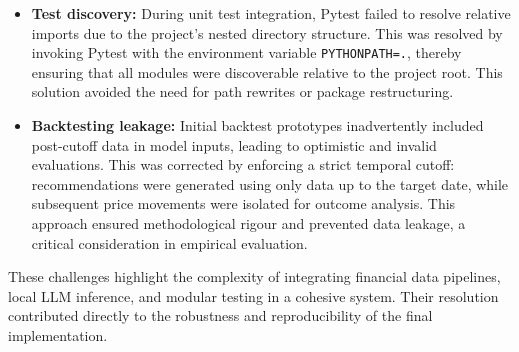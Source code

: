 \begin{itemize}
\item \textbf{Test discovery:}
During unit test integration, Pytest failed to resolve relative imports due to the project’s nested directory structure. This was resolved by invoking Pytest with the environment variable \texttt{PYTHONPATH=.}, thereby ensuring that all modules were discoverable relative to the project root. This solution avoided the need for path rewrites or package restructuring.

\item \textbf{Backtesting leakage:}
Initial backtest prototypes inadvertently included post-cutoff data in model inputs, leading to optimistic and invalid evaluations. This was corrected by enforcing a strict temporal cutoff: recommendations were generated using only data up to the target date, while subsequent price movements were isolated for outcome analysis. This approach ensured methodological rigour and prevented data leakage, a critical consideration in empirical evaluation.

\end{itemize}

These challenges highlight the complexity of integrating financial data pipelines, local LLM inference, and modular testing in a cohesive system. Their resolution contributed directly to the robustness and reproducibility of the final implementation.